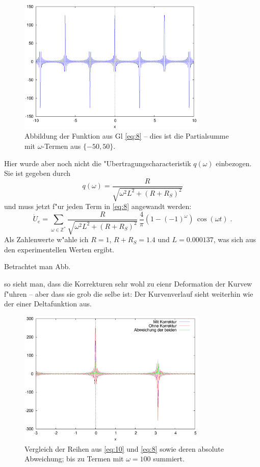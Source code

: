 \documentclass[a4paper,12pt]{article}
\begin{document}
\begin{figure}
  \centering
  \includegraphics[width=0.8\textwidth]{delta}
  \caption{Abbildung der Funktion aus Gl \eqref{eq:8} -- dies ist die
    Partialsumme mit $\omega$-Termen aus $\{ -50, 50 \}$.}
  \label{fig:delta}
\end{figure}


Hier wurde aber noch nicht die "Ubertragungscharacteristik $q(\omega)$
einbezogen. Sie ist gegeben durch
\begin{equation}
  \label{eq:9}
  q(\omega) = \frac{R}{\sqrt{ \omega^2 L^2 + (R + R_S)^2} }
\end{equation}
und muss jetzt f"ur jeden Term in \eqref{eq:8} angewandt werden:
\begin{equation}
  \label{eq:10}
  \dot U_e = \sum_{\omega \in \mathbb Z^\ast} \frac{R}{\sqrt{ \omega^2
      L^2 + (R + R_S)^2} } \, \frac{4}{\pi} ( 1 -
  (-1)^\omega ) \, \cos( \omega t) \;.
\end{equation}
Als Zahlenwerte w"ahle ich $R = 1$,
$R+R_S = 1.4$ und $L = 0.000137$, was sich aus den experimentellen
Werten ergibt.

Betrachtet man Abb.

so sieht man, dass die Korrekturen sehr wohl zu eienr Deformation der
Kurvew f"uhren -- aber dass sie grob die selbe ist: Der Kurvenverlauf
sieht weiterhin wie der einer Deltafunktion aus.

\begin{figure}
  \centering
  \includegraphics[width=0.8\textwidth]{vgl1}
  \caption{Vergleich der Reihen aus \eqref{eq:10} und \eqref{eq:8}
    sowie deren absolute Abweichung; bis zu Termen mit $\omega = 100$
  summiert.}
  \label{fig:vgl1}
\end{figure}
\end{document}
